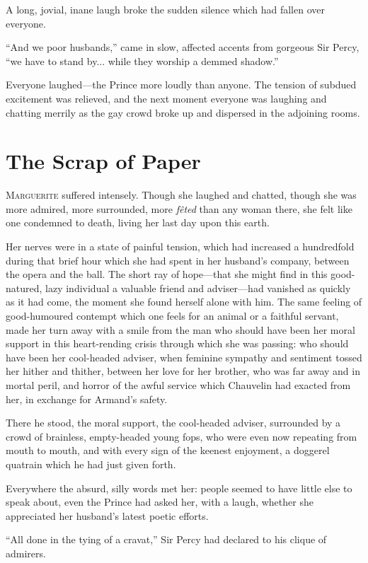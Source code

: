\documentclass[paper=a5,BCOR=7mm,twoside,DIV=calc,12pt,usegeometry,chapterprefix,endperiod,headings=big]{scrbook}
\begin{document}
A long, jovial, inane laugh broke the sudden silence which had fallen over everyone.

\enquote{And we poor husbands,} came in slow, affected accents from gorgeous Sir Percy, \enquote{we have to stand by... while they worship a demmed shadow.}

Everyone laughed---the Prince more loudly than anyone. The tension of subdued excitement was relieved, and the next moment everyone was laughing and chatting merrily as the gay crowd broke up and dispersed in the adjoining rooms.

\chapter{The Scrap of Paper}
\lettrine[lines=4]{M}{arguerite} suffered intensely. Though she laughed and chatted, though she was more admired, more surrounded, more \textit{fêted} than any woman there, she felt like one condemned to death, living her last day upon this earth.

Her nerves were in a state of painful tension, which had increased a hundredfold during that brief hour which she had spent in her husband's company, between the opera and the ball. The short ray of hope---that she might find in this good-natured, lazy individual a valuable friend and adviser---had vanished as quickly as it had come, the moment she found herself alone with him. The same feeling of good-humoured contempt which one feels for an animal or a faithful servant, made her turn away with a smile from the man who should have been her moral support in this heart-rending crisis through which she was passing: who should have been her cool-headed adviser, when feminine sympathy and sentiment tossed her hither and thither, between her love for her brother, who was far away and in mortal peril, and horror of the awful service which Chauvelin had exacted from her, in exchange for Armand's safety.

There he stood, the moral support, the cool-headed adviser, surrounded by a crowd of brainless, empty-headed young fops, who were even now repeating from mouth to mouth, and with every sign of the keenest enjoyment, a doggerel quatrain which he had just given forth.

Everywhere the absurd, silly words met her: people seemed to have little else to speak about, even the Prince had asked her, with a laugh, whether she appreciated her husband's latest poetic efforts.

\enquote{All done in the tying of a cravat,} Sir Percy had declared to his clique of admirers.
\end{document}
